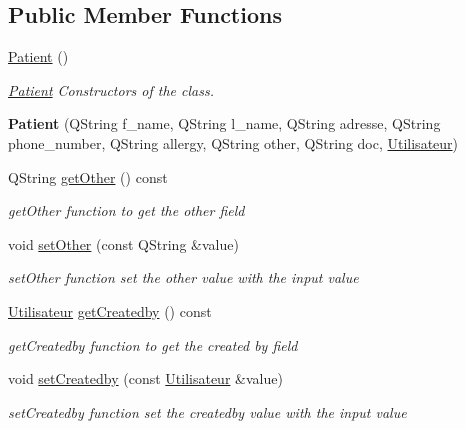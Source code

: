 \subsection*{Public Member Functions}
\begin{DoxyCompactItemize}
\item 
\mbox{\label{class_patient_af34d7593aee6534e995703883265583c}} 
\mbox{\hyperlink{class_patient_af34d7593aee6534e995703883265583c}{Patient}} ()
\begin{DoxyCompactList}\small\item\em \mbox{\hyperlink{class_patient}{Patient}} Constructors of the class. \end{DoxyCompactList}\item 
\mbox{\label{class_patient_af4a9269bfc0345a5957ece97c1ada9a8}} 
{\bfseries Patient} (Q\+String f\+\_\+name, Q\+String l\+\_\+name, Q\+String adresse, Q\+String phone\+\_\+number, Q\+String allergy, Q\+String other, Q\+String doc, \mbox{\hyperlink{class_utilisateur}{Utilisateur}})
\item 
Q\+String \mbox{\hyperlink{class_patient_a819426aede04a6a89b17ea705757cd29}{get\+Other}} () const
\begin{DoxyCompactList}\small\item\em get\+Other function to get the other field \end{DoxyCompactList}\item 
void \mbox{\hyperlink{class_patient_a0ece648106c80c8df117804f24422676}{set\+Other}} (const Q\+String \&value)
\begin{DoxyCompactList}\small\item\em set\+Other function set the other value with the input value \end{DoxyCompactList}\item 
\mbox{\hyperlink{class_utilisateur}{Utilisateur}} \mbox{\hyperlink{class_patient_a2f17f0abc280c2c3854afbd73f98676b}{get\+Createdby}} () const
\begin{DoxyCompactList}\small\item\em get\+Createdby function to get the created by field \end{DoxyCompactList}\item 
void \mbox{\hyperlink{class_patient_ac61823b7a151a384d9b4c06a11013076}{set\+Createdby}} (const \mbox{\hyperlink{class_utilisateur}{Utilisateur}} \&value)
\begin{DoxyCompactList}\small\item\em set\+Createdby function set the createdby value with the input value \end{DoxyCompactList}\item 

\end{DoxyCompactItemize}
